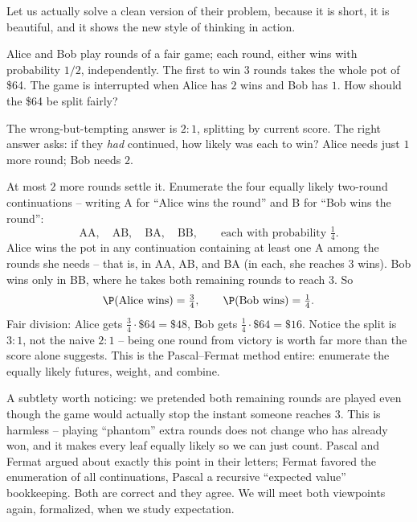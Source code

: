 Let us actually solve a clean version of their problem, because it is short, it is
beautiful, and it shows the new style of thinking in action.

\begin{example}
\label{ch01:ex-points}
Alice and Bob play rounds of a fair game; each round, either wins with probability
$1/2$, independently. The first to win $3$ rounds takes the whole pot of \$64.
The game is interrupted when Alice has $2$ wins and Bob has $1$. How should the
\$64 be split fairly?

The wrong-but-tempting answer is $2{:}1$, splitting by current score. The right
answer asks: if they \emph{had} continued, how likely was each to win? Alice needs
just $1$ more round; Bob needs $2$.

At most $2$ more rounds settle it. Enumerate the four equally likely two-round
continuations -- writing A for ``Alice wins the round'' and B for ``Bob wins the
round'':
\[
  \text{AA},\quad \text{AB},\quad \text{BA},\quad \text{BB},
  \qquad \text{each with probability } \tfrac14.
\]
Alice wins the pot in any continuation containing at least one A among the rounds
she needs -- that is, in AA, AB, and BA (in each, she reaches $3$ wins). Bob wins
only in BB, where he takes both remaining rounds to reach $3$. So
\[
  \P(\text{Alice wins}) = \tfrac34, \qquad \P(\text{Bob wins}) = \tfrac14.
\]
Fair division: Alice gets $\frac34 \cdot \$64 = \$48$, Bob gets
$\frac14 \cdot \$64 = \$16$. Notice the split is $3{:}1$, not the naive $2{:}1$ --
being one round from victory is worth far more than the score alone suggests. This
is the Pascal--Fermat method entire: enumerate the equally likely futures, weight,
and combine.
\end{example}

\begin{remark}
A subtlety worth noticing: we pretended both remaining rounds are played even
though the game would actually stop the instant someone reaches $3$. This is
harmless -- playing ``phantom'' extra rounds does not change who has already won,
and it makes every leaf equally likely so we can just count. Pascal and Fermat
argued about exactly this point in their letters; Fermat favored the enumeration
of all continuations, Pascal a recursive ``expected value'' bookkeeping. Both are
correct and they agree. We will meet both viewpoints again, formalized, when we
study expectation.
\end{remark}

